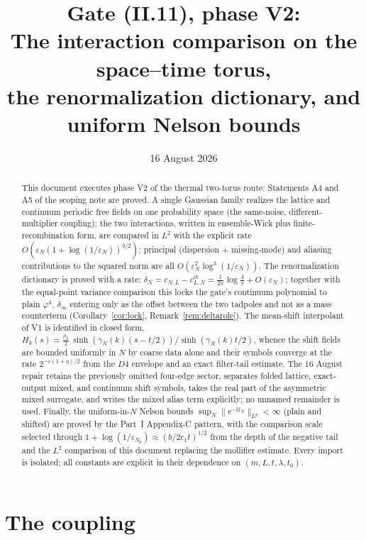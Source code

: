 \documentclass[11pt,a4paper]{article}
\title{Gate (II.11), phase V2:\\[4pt]
\large The interaction comparison on the space--time torus,\\
the renormalization dictionary, and uniform Nelson bounds}
\author{}
\date{16 August 2026}
\theoremstyle{plain}
\theoremstyle{definition}
\newcommand{\eps}{\varepsilon}
\newcommand{\U}{\mathcal U}
\DeclareMathOperator{\sh}{sinh}
\begin{document}
\maketitle

\begin{abstract}
This document executes phase V2 of the thermal two-torus route: Statements A4
and A5 of the scoping note are proved. A single Gaussian family realizes the
lattice and continuum periodic free fields on one probability space (the
same-noise, different-multiplier coupling); the two interactions, written in
ensemble-Wick plus finite-recombination form, are compared in $L^2$ with the
explicit rate $O(\eps_N(1+\log(1/\eps_N))^{3/2})$; principal (dispersion +
missing-mode) and aliasing contributions to the squared norm are all
$O(\eps_N^2\log^3(1/\eps_N))$. The renormalization dictionary is proved with
a rate: $\delta_N=c_{N,L}-c^{\mathrm{ct}}_{L,N}
=\tfrac1{2\pi}\log\tfrac4\pi+O(\eps_N)$; together with the equal-point
variance comparison this locks the gate's continuum polynomial to plain
$\varphi^4$, $\delta_\infty$ entering only as the offset between the two
tadpoles and not as a mass counterterm (Corollary~\ref{cor:lock},
Remark~\ref{rem:deltarole}). The mean-shift interpolant of
V1 is identified in closed form,
$H_k(s)=\tfrac{\rho_k}2\,\sh(\gamma_N(k)(s-t/2))/\sh(\gamma_N(k)t/2)$, whence
the shift fields are bounded uniformly in $N$ by coarse data alone and their
symbols converge at the rate $2^{-r(1+\eta)/2}$ from the $D4$ envelope and an
exact filter-tail estimate.  The 16 August repair retains the previously
omitted four-edge sector, separates folded lattice, exact-output mixed, and
continuum shift symbols, takes the real part of the asymmetric mixed surrogate,
and writes the mixed alias term explicitly; no
unnamed remainder is used. Finally, the uniform-in-$N$ Nelson bounds
$\sup_N\|e^{-\U_N}\|_{L^p}<\infty$ (plain and shifted) are proved by the
Part~I Appendix-C pattern, with the comparison scale selected through
$1+\log(1/\eps_{N_b})\approx(b/2c_1t)^{1/2}$ from the depth of the negative
tail and the $L^2$ comparison of this document replacing the mollifier
estimate. Every import is isolated; all constants are explicit in their
dependence on $(m,L,t,\lambda,t_0)$.
\end{abstract}

\tableofcontents

\section{The coupling}\label{sec:coupling}
\end{document}
